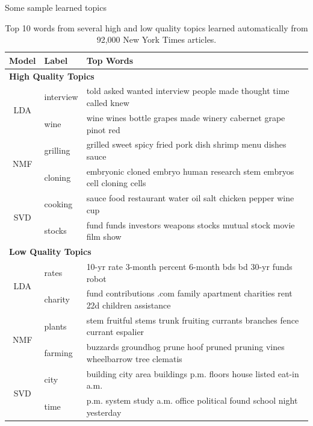 \documentclass[compress]{beamer}
\begin{document}
\begin{frame}{Some sample learned topics}
\begin{table}[h!t!b!]
\center
\tiny
\begin{tabular}{|cll|}
\multicolumn{1}{c}{Model} & Label & \multicolumn{1}{l}{Top Words} \\
\hline
\multicolumn{3}{l}{\textbf{High Quality Topics}} \\
\hline
\multirow{2}{*}{LDA} 
& interview & told asked wanted interview people made thought time called knew
\\
& wine & wine wines bottle grapes made winery cabernet grape pinot red 
\\
\hline
\multirow{2}{*}{NMF} 
& grilling & grilled sweet spicy fried pork dish shrimp menu dishes sauce 
\\
& cloning & embryonic cloned embryo human research stem embryos cell cloning cells
\\
\hline
\multirow{2}{*}{SVD} 
& cooking & sauce food restaurant water oil salt chicken pepper wine cup 
\\
& stocks & fund funds investors weapons stocks mutual stock movie film show 
\\
\hline

\multicolumn{3}{l}{\textbf{Low Quality Topics}} \\
\hline
\multirow{2}{*}{LDA} 
& rates & 10-yr rate 3-month percent 6-month bds bd 30-yr funds robot 
\\
& charity & fund contributions .com family apartment charities rent 22d children assistance
\\
\hline
\multirow{2}{*}{NMF} 
& plants & stem fruitful stems trunk fruiting currants branches fence currant espalier 
\\
& farming & buzzards groundhog prune hoof pruned pruning vines wheelbarrow tree clematis
\\
\hline
\multirow{2}{*}{SVD} 
& city & building city area buildings p.m. floors house listed eat-in a.m.
\\
& time & p.m. system study a.m. office political found school night yesterday 
\\
\hline
\end{tabular}
\caption{Top 10 words from several high and low quality topics learned
automatically from 92,000 New York Times articles.}
\end{table}
\end{frame}
\end{document}
